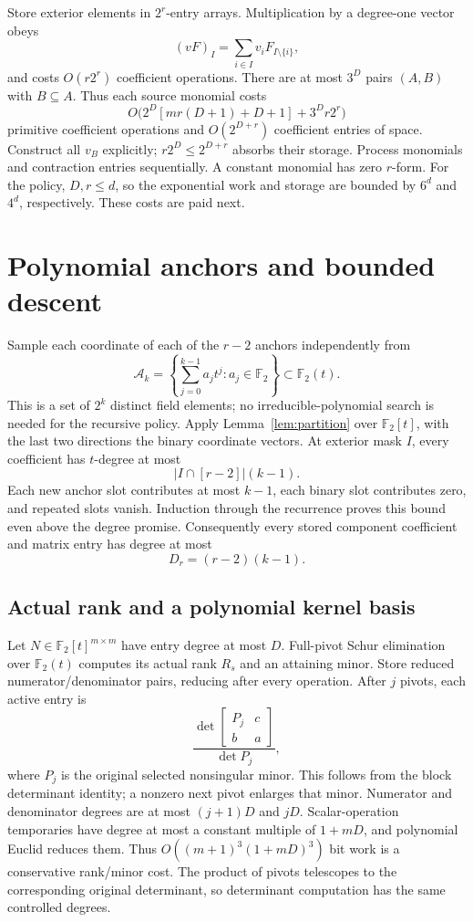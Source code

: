 \documentclass[11pt]{article}
\theoremstyle{remark}\newtheorem{remark}[theorem]{Remark}
\newcommand{\F}{\mathbb F}
\begin{document}
Store exterior elements in $2^r$-entry arrays. Multiplication by a degree-one vector obeys
\[
 (vF)_I=\sum_{i\in I}v_iF_{I\setminus\{i\}},
\]
and costs $O(r2^r)$ coefficient operations. There are at most $3^D$ pairs $(A,B)$ with $B\subseteq A$. Thus each source monomial costs
\begin{equation}\label{eq:partitioncost}
 O\bigl(2^D[mr(D+1)+D+1]+3^D r2^r\bigr)
\end{equation}
primitive coefficient operations and $O(2^{D+r})$ coefficient entries of space. Construct all $v_B$ explicitly; $r2^D\le2^{D+r}$ absorbs their storage. Process monomials and contraction entries sequentially. A constant monomial has zero $r$-form. For the policy, $D,r\le d$, so the exponential work and storage are bounded by $6^d$ and $4^d$, respectively. These costs are paid next.

\section{Polynomial anchors and bounded descent}\label{sec:descent}
Sample each coordinate of each of the $r-2$ anchors independently from
\[
 \mathcal A_k=\left\{\sum_{j=0}^{k-1}a_jt^j:a_j\in\F_2\right\}\subset\F_2(t).
\]
This is a set of $2^k$ distinct field elements; no irreducible-polynomial search is needed for the recursive policy. Apply Lemma~\ref{lem:partition} over $\F_2[t]$, with the last two directions the binary coordinate vectors. At exterior mask $I$, every coefficient has $t$-degree at most
\[
 |I\cap[r-2]|(k-1).
\]
Each new anchor slot contributes at most $k-1$, each binary slot contributes zero, and repeated slots vanish. Induction through the recurrence proves this bound even above the degree promise. Consequently every stored component coefficient and matrix entry has degree at most
\begin{equation}\label{eq:entrydegree}
 D_r=(r-2)(k-1).
\end{equation}

\subsection{Actual rank and a polynomial kernel basis}
Let $N\in\F_2[t]^{m\times m}$ have entry degree at most $D$. Full-pivot Schur elimination over $\F_2(t)$ computes its actual rank $R_s$ and an attaining minor. Store reduced numerator/denominator pairs, reducing after every operation. After $j$ pivots, each active entry is
\[
 \frac{\det\begin{bmatrix}P_j&c\\ b&a\end{bmatrix}}{\det P_j},
\]
where $P_j$ is the original selected nonsingular minor. This follows from the block determinant identity; a nonzero next pivot enlarges that minor. Numerator and denominator degrees are at most $(j+1)D$ and $jD$. Scalar-operation temporaries have degree at most a constant multiple of $1+mD$, and polynomial Euclid reduces them. Thus $O((m+1)^3(1+mD)^3)$ bit work is a conservative rank/minor cost. The product of pivots telescopes to the corresponding original determinant, so determinant computation has the same controlled degrees.
\end{document}
